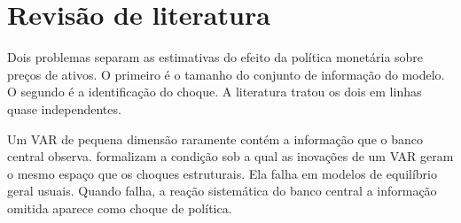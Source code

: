 \documentclass[preprint,authoryear,review,12pt]{elsarticle}
\begin{document}



\section{Revisão de literatura}

Dois problemas separam as estimativas do efeito da política monetária sobre preços de ativos. O primeiro é o tamanho do conjunto de informação do modelo. O segundo é a identificação do choque. A literatura tratou os dois em linhas quase independentes.

Um VAR de pequena dimensão raramente contém a informação que o banco central observa. \cite{villaverde} formalizam a condição sob a qual as inovações de um VAR geram o mesmo espaço que os choques estruturais. Ela falha em modelos de equilíbrio geral usuais. Quando falha, a reação sistemática do banco central a informação omitida aparece como choque de política.
\end{document}
